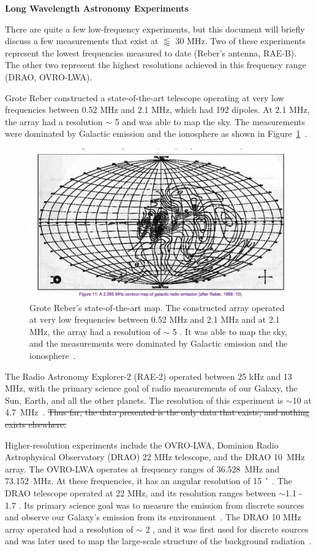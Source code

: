 {\bf{Long Wavelength Astronomy Experiments}}

There are quite a few low-frequency experiments, but this document will briefly discuss a few measurements that exist at $\lessapprox$ 30 MHz. Two of these experiments represent the lowest frequencies measured to date (Reber's antenna, RAE-B). The other two represent the highest resolutions achieved in this frequency range (DRAO, OVRO-LWA).

Grote Reber constructed a state-of-the-art telescope operating at very low frequencies between 0.52 MHz and 2.1 MHz, which had 192 dipoles. At 2.1 MHz, the array had a resolution $\sim$ 5 \degree and was able to map the sky. The measurements were dominated by Galactic emission and the ionosphere as shown in Figure~\ref{Fig:Rebermap}~\citep{1988JRASC..82...93R}. 

\begin{figure}
	\centering
	\includegraphics[width=0.7\linewidth]{Figures/Rebermap}
	\caption{Grote Reber's state-of-the-art map. The constructed array operated at very low frequencies between 0.52 MHz and 2.1 MHz and at 2.1 MHz, the array had a resolution of $\sim$ 5 \degree. It was able to map the sky, and the measurements were dominated by Galactic emission and the ionosphere~\citep{1988JRASC..82...93R}.}
	\label{Fig:Rebermap}
\end{figure}

The Radio Astronomy Explorer-2 (RAE-2) operated between 25 kHz and 13 MHz, with the primary science goal of radio measurements of our Galaxy, the Sun, Earth, and all the other planets. The resolution of this experiment is $\sim$10 \degree at \SI{4.7}{\mega\hertz}~\citep{1975A&A....40..365A}. \st{Thus far, the data presented is the only data that exists, and nothing exists elsewhere.}

Higher-resolution experiments include the OVRO-LWA, Dominion Radio Astrophysical Observatory (DRAO) 22 MHz telescope, and the DRAO \SI{10}{\mega\hertz} array. The OVRO-LWA operates at frequency ranges of \SI{36.528}{\mega\hertz} and \SI{73.152}{\mega\hertz}. At these frequencies, it has an angular resolution of \SI{15}{\arcminute}~\citep{2018AJ....156...32E}. The DRAO telescope operated at 22 MHz, and its resolution ranges between $\sim$1.1 \degree - 1.7 \degree. Its primary science goal was to measure the emission from discrete sources and observe our Galaxy's emission from its environment~\citep{1999A&AS..137....7R}. The DRAO 10 MHz array operated had a resolution of $\sim$ 2  \degree, and it was first used for discrete sources and was later used to map the large-scale structure of the background radiation~\citep{1976MNRAS.177..601C}.

